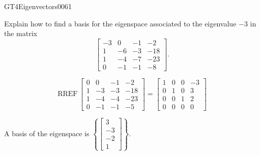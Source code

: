 \begin{exercise}{GT4}{Eigenvectors}{0061} 
\begin{exerciseStatement} 

Explain how to find a basis for the eigenspace associated to the eigenvalue \(-3\) in the matrix \[\left[\begin{array}{cccc}
-3 & 0 & -1 & -2 \\
1 & -6 & -3 & -18 \\
1 & -4 & -7 & -23 \\
0 & -1 & -1 & -8
\end{array}\right].\]

 \end{exerciseStatement}
 \begin{exerciseAnswer} 

\[\mathrm{RREF}\,\left[\begin{array}{cccc}
0 & 0 & -1 & -2 \\
1 & -3 & -3 & -18 \\
1 & -4 & -4 & -23 \\
0 & -1 & -1 & -5
\end{array}\right]=\left[\begin{array}{cccc}
1 & 0 & 0 & -3 \\
0 & 1 & 0 & 3 \\
0 & 0 & 1 & 2 \\
0 & 0 & 0 & 0
\end{array}\right]\]

 

A basis of the eigenspace is \(\left\{ \left[\begin{array}{c}
3 \\
-3 \\
-2 \\
1
\end{array}\right] \right\}\).

 \end{exerciseAnswer}
 \end{exercise}


\newpage




